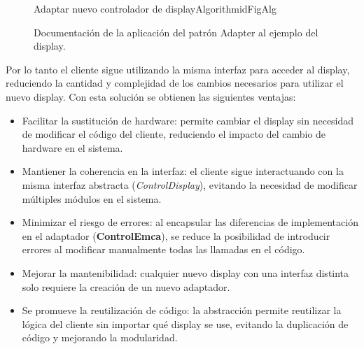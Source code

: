 \begin{figure}[h!]
\caption{Documentación de la aplicación del patrón Adapter al ejemplo del display.}
\label{docAdapter}
\begin{pattern}[]{Adaptar nuevo controlador de display}{Algorithm}{idFigAlg}
\assigns
{}
\end{pattern}
\end{figure}

Por lo tanto el cliente sigue utilizando la misma interfaz para acceder al display, reduciendo la cantidad y complejidad de los cambios necesarios para utilizar el nuevo display. Con esta solución se obtienen las siguientes ventajas:

\begin{itemize}

\item Facilitar la sustitución de hardware: permite cambiar el display sin necesidad de modificar el código del cliente, reduciendo el impacto del cambio de hardware en el sistema.

\item Mantiener la coherencia en la interfaz: el cliente sigue interactuando con la misma interfaz abstracta (\textit{ControlDisplay}), evitando la necesidad de modificar múltiples módulos en el sistema.

\item Minimizar el riesgo de errores: al encapsular las diferencias de implementación en el adaptador (\textbf{ControlEmca}), se reduce la posibilidad de introducir errores al modificar manualmente todas las llamadas en el código.

\item Mejorar la mantenibilidad: cualquier nuevo display con una interfaz distinta solo requiere la creación de un nuevo adaptador.

\item Se promueve la reutilización de código: la abstracción permite reutilizar la lógica del cliente sin importar qué display se use, evitando la duplicación de código y mejorando la modularidad.
\end{itemize}


